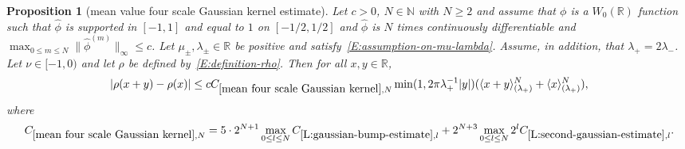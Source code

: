 \documentclass[12pt,reqno]{amsart}
\theoremstyle{plain}
\newtheorem{proposition}[theorem]{Proposition}
\numberwithin{equation}{section}
\theoremstyle{remark}
\newcommand{\using}[1]{}
\newcommand{\R}{{\mathbb R}}
\newcommand{\pd}[1]{{\color{blue}{[P: #1]}}}
\begin{document}
\begin{proposition}[mean value four scale Gaussian kernel estimate]\label{mean four scale Gaussian kernel}\using{L:gaussian-bump-decomposition}\using{mean value bump estimate 2}\using{L:gaussian-bump-estimate}\using{L:second-gaussian-estimate}
Let $c>0$, $N\in \mathbb N$ with $N\geq 2$ and assume that $\phi$ is a $W_0(\R)$ function such that
$\widehat{\phi}$ is supported in $[-1,1]$ and equal to $1$ on $[-1/2,1/2]$ and $\widehat{\phi}$ is $N$ times continuously differentiable and $\max_{0\leq m \leq N} \|\widehat{\phi}^{(m)}\|_{\infty} \leq c$.
Let $\mu_\pm,\lambda_\pm\in\mathbb R$ be positive and satisfy~\eqref{E:assumption-on-mu-lambda}. Assume, in addition, that $\lambda_{+}=2\lambda_{-}$.
Let $\nu\in [-1,0)$ and let $\rho$ be defined by~\eqref{E:definition-rho}.
Then for all $x,y \in\mathbb{R}$,
\begin{equation}\label{E:mean-value}
|\rho(x+y)-\rho(x)| \le c C_{\ref{mean four scale Gaussian kernel},N} \min(1,2\pi \lambda_{+}^{-1}|y|) (\langle x+y\rangle^N_{(\lambda_+)}+
\langle x\rangle^N_{(\lambda_+)}),
\end{equation}
where
\begin{equation}\label{auto:mean-four-scale-Gaussian-constant} C_{\ref{mean four scale Gaussian kernel},N} =  5\cdot 2^{N+1}\max_{0\leq l \leq N} C_{\ref{L:gaussian-bump-estimate},l} +2^{N+3}\max_{0\leq l \leq N} 2^lC_{\ref{L:second-gaussian-estimate},l}.\end{equation}


\pd{$2^{2^{N+3}+30(m+N)^4}$ or $2^{2^{2^{N+m+2}}}$ or $4^{4^{N+m+2}}$ }
\end{proposition}
\end{document}

